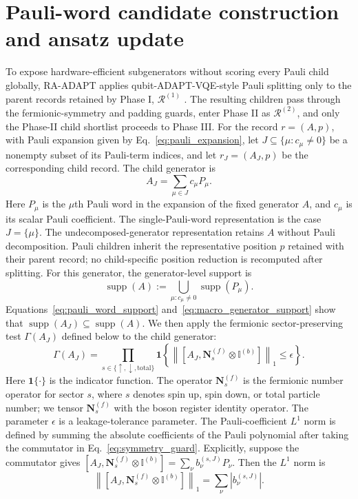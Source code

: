\documentclass[
  reprint,
  amsmath,
  amssymb,
  aps,
  pra,
  nofootinbib,
  superscriptaddress,
  floatfix
]{revtex4-2}
\begin{document}
\section{Pauli-word candidate construction and ansatz update}
\label{subsec:proposal_refinement_update}
To expose hardware-efficient subgenerators without scoring every Pauli child
globally, \textsc{RA-ADAPT} applies qubit-ADAPT-VQE-style Pauli splitting only to
the parent records retained by Phase I,
\(\mathcal R^{(1)}\) \cite{Tang2021}. The resulting children pass
through the fermionic-symmetry and padding guards, enter Phase II as
\(\mathcal R^{(2)}\), and only the Phase-II child shortlist proceeds
to Phase III.
For the record
\(r=(A,p)\), with Pauli expansion given by Eq.~\eqref{eq:pauli_expansion}, let
\(J\subseteq\{\mu:c_\mu\ne0\}\) be a nonempty subset of its Pauli-term
indices, and let
\(r_J=(A_J,p)\) be the corresponding child record. The child generator is
\begin{equation*}
A_J=\sum_{\mu\in J}c_{\mu}P_{\mu}.
\end{equation*}
Here \(P_{\mu}\) is the \(\mu\)th Pauli word in the expansion of the fixed
generator \(A\), and \(c_{\mu}\) is its scalar Pauli coefficient.
The single-Pauli-word representation is the case \(J=\{\mu\}\). The
undecomposed-generator representation retains \(A\) without Pauli
decomposition.
Pauli children inherit the representative position \(p\) retained with their
parent record; no child-specific position reduction is recomputed after
splitting.
For this generator, the generator-level support is
\begin{equation}
\operatorname{supp}(A)
:=
\bigcup_{\mu:c_{\mu}\ne0}
\operatorname{supp}(P_{\mu}).
\label{eq:macro_generator_support}
\end{equation}
Equations~\eqref{eq:pauli_word_support} and~\eqref{eq:macro_generator_support}
show that
\(\operatorname{supp}(A_J)\subseteq\operatorname{supp}(A)\). We then apply
the fermionic sector-preserving test \(\Gamma(A_J)\) defined below to the
child generator:
\begin{equation}
\Gamma(A_J)
=
\prod_{s\in\{\uparrow,\downarrow,\mathrm{total}\}}
\mathbf 1
\left\{
\left\|
\left[
A_J,\mathbf N_s^{(f)}\otimes \mathbb I^{(b)}
\right]
\right\|_1
\le \epsilon
\right\}.
\label{eq:symmetry_guard}
\end{equation}
Here \(\mathbf 1\{\cdot\}\) is the indicator function. The operator \(\mathbf N_s^{(f)}\) is the fermionic number operator for sector \(s\), where \(s\) denotes spin up, spin
down, or total particle number; we tensor \(\mathbf N_s^{(f)}\) with the boson
register identity operator. The parameter \(\epsilon\) is a leakage-tolerance
parameter. The Pauli-coefficient \(L^1\) norm is defined by summing the absolute
coefficients of the Pauli polynomial after taking the commutator in
Eq.~\eqref{eq:symmetry_guard}. Explicitly, suppose the commutator gives
\([A_J,\mathbf N_s^{(f)}\otimes \mathbb I^{(b)}]
=\sum_\nu b_\nu^{(s,J)}P_\nu\). Then the \(L^1\) norm is
\[
\left\|
\left[
A_J,\mathbf N_s^{(f)}\otimes \mathbb I^{(b)}
\right]
\right\|_1
=
\sum_\nu |b_\nu^{(s,J)}|.
\]
\end{document}
